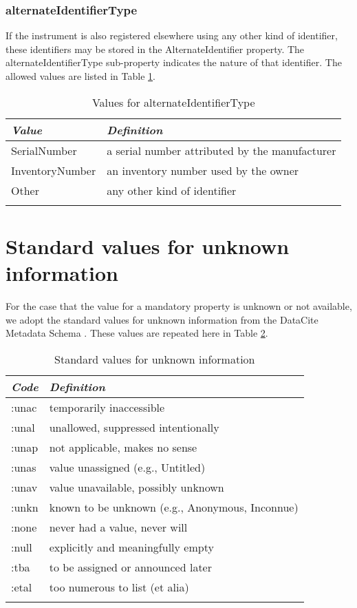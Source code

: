 \documentclass[titlepage=true,twoside=false,DIV=13]{scrartcl}
\begin{document}
\subsubsection{alternateIdentifierType}

If the instrument is also registered elsewhere using any other kind of
identifier, these identifiers may be stored in the AlternateIdentifier
property.  The alternateIdentifierType sub-property indicates the
nature of that identifier.  The allowed values are listed in Table
\ref{tab:schema:values:alternateIdentifierType}.

\begin{longtable}{|l|l|}
  \hline
  \emph{Value} & \emph{Definition} \\
  \hline \endhead
  \hline \endfoot\endlastfoot
  SerialNumber    & a serial number attributed by the manufacturer \\
  InventoryNumber & an inventory number used by the owner \\
  Other           & any other kind of identifier \\
  \hline
  \caption{Values for alternateIdentifierType}
  \label{tab:schema:values:alternateIdentifierType}
\end{longtable}

\appendix

\section{Standard values for unknown information}
\label{appendix:unknown}

For the case that the value for a mandatory property is unknown or not
available, we adopt the standard values for unknown information from
the DataCite Metadata Schema \cite{datacite:schema}.  These values are
repeated here in Table \ref{tab:appendix:unknown}.

\begin{longtable}{|l|l|}
  \hline
  \emph{Code} & \emph{Definition} \\
  \hline \endhead
  \hline \endfoot\endlastfoot
  :unac & temporarily inaccessible \\
  :unal & unallowed, suppressed intentionally \\
  :unap & not applicable, makes no sense \\
  :unas & value unassigned (e.g., Untitled) \\
  :unav & value unavailable, possibly unknown \\
  :unkn & known to be unknown (e.g., Anonymous, Inconnue) \\
  :none & never had a value, never will \\
  :null & explicitly and meaningfully empty \\
  :tba  & to be assigned or announced later \\
  :etal & too numerous to list (et alia) \\
  \hline
  \caption{Standard values for unknown information}
  \label{tab:appendix:unknown}
\end{longtable}
\end{document}
